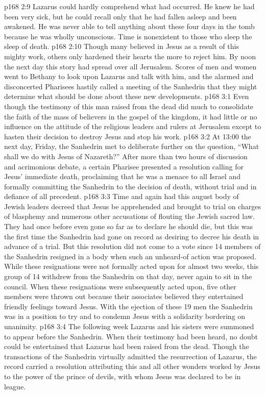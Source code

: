\vs p168 2:9 \pc Lazarus could hardly comprehend what had occurred. He knew he had been very sick, but he could recall only that he had fallen asleep and been awakened. He was never able to tell anything about these four days in the tomb because he was wholly unconscious. Time is nonexistent to those who sleep the sleep of death.
\vs p168 2:10 Though many believed in Jesus as a result of this mighty work, others only hardened their hearts the more to reject him. By noon the next day this story had spread over all Jerusalem. Scores of men and women went to Bethany to look upon Lazarus and talk with him, and the alarmed and disconcerted Pharisees hastily called a meeting of the Sanhedrin that they might determine what should be done about these new developments.
\vs p168 3:1 Even though the testimony of this man raised from the dead did much to consolidate the faith of the mass of believers in the gospel of the kingdom, it had little or no influence on the attitude of the religious leaders and rulers at Jerusalem except to hasten their decision to destroy Jesus and stop his work.
\vs p168 3:2 \pc At 13:00 the next day, Friday, the Sanhedrin met to deliberate further on the question, “What shall we do with Jesus of Nazareth?” After more than two hours of discussion and acrimonious debate, a certain Pharisee presented a resolution calling for Jesus’ immediate death, proclaiming that he was a menace to all Israel and formally committing the Sanhedrin to the decision of death, without trial and in defiance of all precedent.
\vs p168 3:3 Time and again had this august body of Jewish leaders decreed that Jesus be apprehended and brought to trial on charges of blasphemy and numerous other accusations of flouting the Jewish sacred law. They had once before even gone so far as to declare he should die, but this was the first time the Sanhedrin had gone on record as desiring to decree his death in advance of a trial. But this resolution did not come to a vote since 14 members of the Sanhedrin resigned in a body when such an unheard\hyp{}of action was proposed. While these resignations were not formally acted upon for almost two weeks, this group of 14 withdrew from the Sanhedrin on that day, never again to sit in the council. When these resignations were subsequently acted upon, five other members were thrown out because their associates believed they entertained friendly feelings toward Jesus. With the ejection of these 19 men the Sanhedrin was in a position to try and to condemn Jesus with a solidarity bordering on unanimity.
\vs p168 3:4 The following week Lazarus and his sisters were summoned to appear before the Sanhedrin. When their testimony had been heard, no doubt could be entertained that Lazarus had been raised from the dead. Though the transactions of the Sanhedrin virtually admitted the resurrection of Lazarus, the record carried a resolution attributing this and all other wonders worked by Jesus to the power of the prince of devils, with whom Jesus was declared to be in league.
